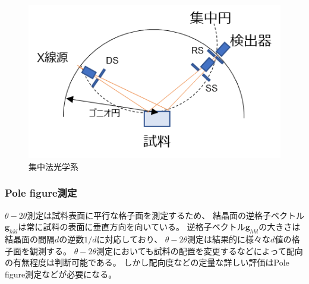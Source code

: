 \documentclass[dvipdfmx,12pt,a4paper]{jreport}
\begin{document}
			\newpage
			\begin{figure}[h]
				\centering
				\includegraphics[scale=1.3]{XRD_theta_2theta_光学系.png}
				\caption{集中法光学系}
				\label{集中法光学系}
			\end{figure}

			\subsubsection{Pole figure測定}
			$\theta-2\theta$測定は試料表面に平行な格子面を測定するため、
			結晶面の逆格子ベクトル$\bm{g}_{hkl}$は常に試料の表面に垂直方向を向いている。
			逆格子ベクトル$\bm{g}_{hkl}$の大きさは結晶面の間隔$d$の逆数$1/d$に対応しており、
			$\theta-2\theta$測定は結果的に様々な$d$値の格子面を観測する。
			$\theta-2\theta$測定においても試料の配置を変更するなどによって配向の有無程度は判断可能である。
			しかし配向度などの定量な詳しい評価はPole figure測定などが必要になる。
			
\end{document}
